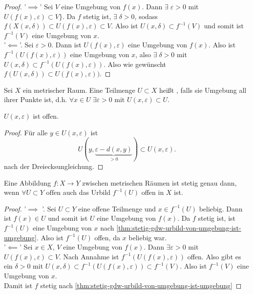 \begin{proof}
'$\implies$' Sei $V$ eine Umgebung von  $f(x)$. Dann  $\exists \; ε>0$ mit $U(f(x),ε) \subset V\}$. Da $f$ stetig ist,  $\exists \; δ>0$, sodass $f(X(x,δ)) \subset U(f(x),ε)\subset V$. Also ist $U(x,δ)\subset f^{-1}(V)$ und somit ist $f^{-1}(V)$ eine Umgebung von $x$. \\
'$\impliedby$'.  Sei $ε>0$. Dann ist  $U(f(x),ε)$ eine Umgebung von  $f(x)$. Also ist  $f^{-1}(U(f(x),ε))$ eine Umgebung von $x$, also  $\exists \; δ>0$ mit $U(x,δ) \subset f^{-1}(U(f(x),ε))$. Also wie gewünscht $f(U(x,δ)) \subset U(f(x),ε))$.
\end{proof}

\begin{definition}\label{def:offene-menge-metrischer-raum} 
    Sei $X$ ein metrischer Raum. Eine Teilmenge  $U\subset X$ heißt , falls sie Umgebung all ihrer Punkte ist, d.h. $\forall x\in U \;\exists ε>0$ mit $U(x,ε)\subset U$.
\end{definition}
\begin{remark}
    $U(x,ε)$ ist offen.
\begin{proof}
    Für alle $y\in U(x,ε)$ ist
    \[
        U(y, \underbrace{ε - d(x,y)}_{>0}) \subset U(x,ε)
    .\] 
    nach der Dreiecksungleichung.
\end{proof}
\end{remark}

\begin{theorem}\label{thm:urbild-offener-menge-ist-offen}
    Eine Abbildung $f:X\to Y$ zwischen metrischen Räumen ist stetig genau dann, wenn $\forall U \subset Y \text{  offen}$ auch das Urbild $f^{-1}(U)$ offen in $X$ ist.
\end{theorem}
\begin{proof}
    '$\implies$ '. Sei $U\subset Y$ eine offene Teilmenge und $x\in f^{-1}(U)$ beliebig. Dann ist $f(x) \in U$ und somit ist $U$ eine Umgebung von  $f(x)$. Da  $f$ stetig ist, ist  $f^{-1}(U)$ eine Umgebung von $x$ nach \autoref{thm:stetig-gdw-urbild-von-umgebung-ist-umgebung}. Also ist $f^{-1}(U)$ offen, da $x$ beliebig war.\\
    '$\impliedby$' Sei $x\in X$, $V$ eine Umgebung von  $f(x)$. Dann  $\exists ε>0$ mit $U(f(x),ε)\subset V$. Nach Annahme ist $f^{-1}(U(f(x),ε))$ offen. Also gibt es ein $δ>0$ mit  $U(x,δ) \subset f^{-1}(U(f(x),ε))\subset f^{-1}(V)$. Also ist $f^{-1}(V)$ eine Umgebung von $x$. \\
    Damit ist  $f$ stetig nach \autoref{thm:stetig-gdw-urbild-von-umgebung-ist-umgebung}
\end{proof}

